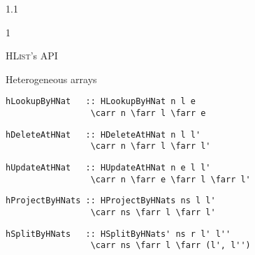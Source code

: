 \documentclass{slides}
\newenvironment{myslide}{\begin{slide}\color{Blue}\begin{boxedminipage}{1.1\hsize}\begin{boxedminipage}{1\hsize}\color{Black}
\vspace{-170\in}
}{%
\smallskip
\end{boxedminipage}
\end{boxedminipage}
\end{slide}}
\newenvironment{myslide}{\begin{slide}
}{%
\end{slide}}
\newenvironment{myslide}{\begin{slide}\color{White}\begin{boxedminipage}{1.1\hsize}\color{Black}
\vspace{-170\in}
}{%
\smallskip
\end{boxedminipage}
\end{slide}}
\newcommand{\header}[1]{{\large \color{Red} #1}}
\newcommand{\blau}[1]{{\vspace{-50\in}\normalsize \color{Blue} #1}}
\newcommand{\HList}{\textsc{HList}}
\newcommand{\farr}{\ensuremath{\to}}
\newcommand{\carr}{\ensuremath{\Rightarrow}}
\begin{document}
\begin{myslide}

\header{\HList's API}

\vspace{-66\in}

\blau{Heterogeneous arrays}

\medskip

\begin{Verbatim}[fontfamily=courier,fontsize=\small,commandchars=\\\{\}]
 hLookupByHNat   :: HLookupByHNat n l e     
                 \carr n \farr l \farr e
\end{Verbatim}

\medskip

\begin{Verbatim}[fontfamily=courier,fontsize=\small,commandchars=\\\{\}]
 hDeleteAtHNat   :: HDeleteAtHNat n l l'    
                 \carr n \farr l \farr l'
\end{Verbatim}

\medskip

\begin{Verbatim}[fontfamily=courier,fontsize=\small,commandchars=\\\{\}]
 hUpdateAtHNat   :: HUpdateAtHNat n e l l'  
                 \carr n \farr e \farr l \farr l'
\end{Verbatim}

\medskip

\begin{Verbatim}[fontfamily=courier,fontsize=\small,commandchars=\\\{\}]
 hProjectByHNats :: HProjectByHNats ns l l' 
                 \carr ns \farr l \farr l'
\end{Verbatim}

\medskip

\begin{Verbatim}[fontfamily=courier,fontsize=\small,commandchars=\\\{\}]
 hSplitByHNats   :: HSplitByHNats' ns r l' l'' 
                 \carr ns \farr l \farr (l', l'')
\end{Verbatim}

\end{myslide}



\end{document}
